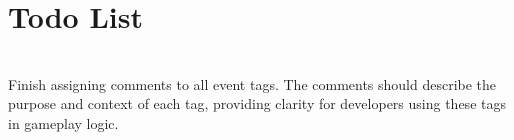 \chapter{Todo List }
\hypertarget{todo}{}\label{todo}

\begin{DoxyRefList}
\item[{\parbox[t]{\linewidth}{File \doxylink{_event_tags_8h}{Event\+Tags.h} }}]\hfill \\
\label{todo__todo000001}%
%
Finish assigning comments to all event tags. The comments should describe the purpose and context of each tag, providing clarity for developers using these tags in gameplay logic. 
\end{DoxyRefList}